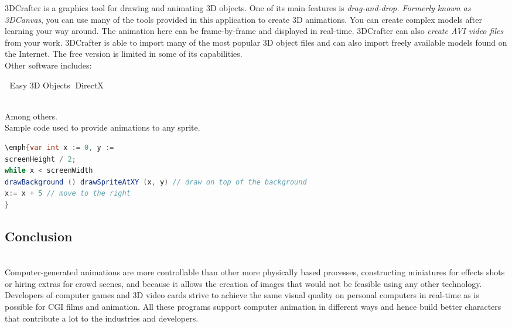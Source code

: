 \documentclass[12pt,a4paper]{article}
\begin{document}
3DCrafter is a graphics tool for drawing and animating 3D objects. One of its main features is \textit{drag-and-drop. Formerly known as 3DCanvas}, you can use many of the tools provided in this application to create 3D animations. You can create complex models after learning your way around. The animation here can be frame-by-frame and displayed in real-time. 3DCrafter can also\textit{ create AVI video files} from your work. 3DCrafter is able to import many of the most popular 3D object files and can also import freely available models found on the Internet. The free version is limited in some of its capabilities.
\\
Other software includes:
\\
\begin{list}{	K-3D, Earthquake 3d}{	Easy 3D Objects}{	Easy 3D Objects}{	DirectX}
\item 
\end{list}
\\
Among others.
\\
Sample code used to provide animations to any sprite.
\\
\begin{lstlisting}[language=java]
\emph{var int x := 0, y := 
screenHeight / 2; 
while x < screenWidth 
drawBackground () drawSpriteAtXY (x, y) // draw on top of the background 
x:= x + 5 // move to the right
}
\end{lstlisting}
\begin{center}
\section*{Conclusion}
\end{center}
\\
Computer-generated animations are more controllable than other more physically based processes, constructing miniatures for effects shots or hiring extras for crowd scenes, and because it allows the creation of images that would not be feasible using any other technology.
Developers of computer games and 3D video cards strive to achieve the same visual quality on personal computers in real-time as is possible for CGI films and animation.
All these programs support computer animation in different ways and hence build better characters that contribute a lot to the industries and developers.
\end{document}
